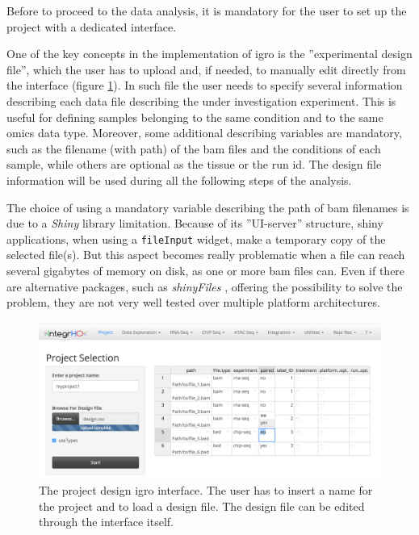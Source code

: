 Before to proceed to the data analysis, it is mandatory for the user to set up the project with a dedicated interface.

One of the key concepts in the implementation of \gls{igro} is the ''experimental design file'', which the user has to upload and, if needed, to manually edit directly from the interface (figure \ref{fig:integrhodesign}).
In such file the user needs to specify several information describing each data file describing the under investigation experiment.
This is useful for defining samples belonging to the same condition and to the same omics data type. Moreover, some additional describing variables are mandatory, such as the filename (with path) of the \gls{bam} files and the conditions of each sample, while others are optional as the tissue or the run id. 
The design file information will be used during all the following steps of the analysis.


The choice of using a mandatory variable describing the path of  \gls{bam} filenames is due to a \textit{Shiny} library limitation. 
Because of its ''UI-server'' structure, shiny applications, when using a \lstinline!fileInput! widget, make a temporary copy of the selected file(s).
But this aspect becomes really problematic when a file can reach several gigabytes of memory on disk, as one or more \gls{bam} files can.
Even if there are alternative packages, such as \textit{shinyFiles} \cite{Pedersen}, offering the possibility to solve the problem, they are not very well tested over multiple platform architectures. %

\begin{figure}[ht]
\centering
\includegraphics[width=\textwidth, keepaspectratio]{img/integrho/design.png}
\caption[IntegrHO design interface]{The project design \gls{igro} interface. The user has to insert a name for the project and to load a design file.
The design file can be edited through the interface itself.}
\label{fig:integrhodesign}
\end{figure}

